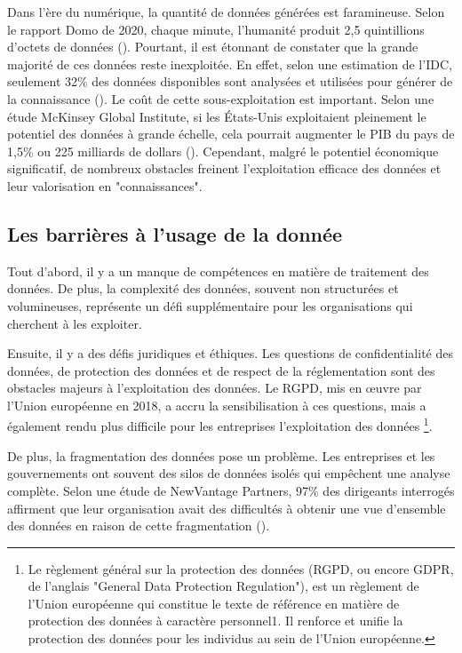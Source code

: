 Dans l'ère du numérique, la quantité de données générées est faramineuse. Selon le rapport Domo de 2020, chaque minute, l'humanité produit 2,5 quintillions d'octets de données (\cite{domo_data_2020}). Pourtant, il est étonnant de constater que la grande majorité de ces données reste inexploitée. En effet, selon une estimation de l'IDC, seulement 32\% des données disponibles sont analysées et utilisées pour générer de la connaissance (\cite{reinsel_digitization_2018}).
Le coût de cette sous-exploitation est important. Selon une étude McKinsey Global Institute, si les États-Unis exploitaient pleinement le potentiel des données à grande échelle, cela pourrait augmenter le PIB du pays de 1,5\% ou 225 milliards de dollars (\cite{james_manyika_big_2011}). Cependant, malgré le potentiel économique significatif, de nombreux obstacles freinent l'exploitation efficace des données et leur valorisation en "connaissances".


\subsection{Les barrières à l'usage de la donnée}\label{subsec:barrieres}

Tout d'abord, il y a un manque de compétences en matière de traitement des données. De plus, la complexité des données, souvent non structurées et volumineuses, représente un défi supplémentaire pour les organisations qui cherchent à les exploiter.

Ensuite, il y a des défis juridiques et éthiques. Les questions de confidentialité des données, de protection des données et de respect de la réglementation sont des obstacles majeurs à l'exploitation des données. Le RGPD, mis en œuvre par l'Union européenne en 2018, a accru la sensibilisation à ces questions, mais a également rendu plus difficile pour les entreprises l'exploitation des données \footnote{Le règlement général sur la protection des données (RGPD, ou encore GDPR, de l'anglais "General Data Protection Regulation"), est un règlement de l'Union européenne qui constitue le texte de référence en matière de protection des données à caractère personnel1. Il renforce et unifie la protection des données pour les individus au sein de l'Union européenne.}.

De plus, la fragmentation des données pose un problème. Les entreprises et les gouvernements ont souvent des silos de données isolés qui empêchent une analyse complète. Selon une étude de NewVantage Partners, 97\% des dirigeants interrogés affirment que leur organisation avait des difficultés à obtenir une vue d'ensemble des données en raison de cette fragmentation (\cite{noauthor_big_2020}).

